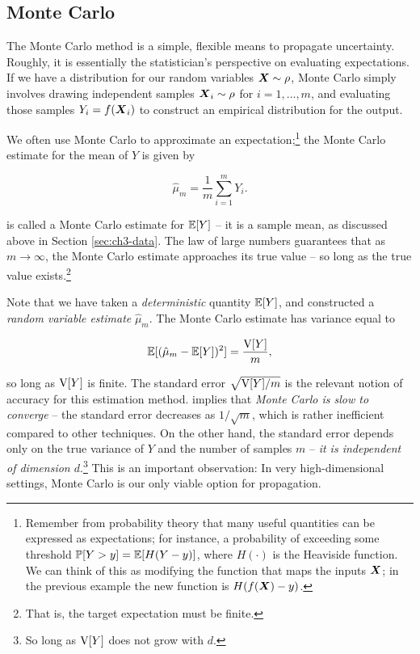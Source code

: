 \documentclass[../primer.tex]{subfiles}
\begin{document}
\subsection{Monte Carlo}
The Monte Carlo method is a simple, flexible means to propagate uncertainty.
Roughly, it is essentially the statistician's perspective on evaluating
expectations. If we have a distribution for our random variables $\boldsymbol{X}\sim\rho$,
Monte Carlo simply involves drawing independent samples $\boldsymbol{X}_i\sim\rho$ for
$i=1,\dots,m$, and evaluating those samples $Y_i = f(\boldsymbol{X}_i)$ to construct an
empirical distribution for the output.

We often use Monte Carlo to approximate an expectation;\footnote{Remember from
  probability theory that many useful quantities can be expressed as
  expectations; for instance, a probability of exceeding some threshold $\mathbb{P}[Y>y]
  = \mathbb{E}[H(Y-y)]$, where $H(\cdot)$ is the Heaviside function. We can think of
  this as modifying the function that maps the inputs $\boldsymbol{X}$; in the previous
  example the new function is $H(f(\boldsymbol{X})-y)$.} the Monte Carlo estimate for the
mean of $Y$ is given by

\begin{equation} \label{eq:ch4-mc-mean}
  \hat{\mu}_m = \frac{1}{m}\sum_{i=1}^m Y_i.
\end{equation}

\noindent {} is called a Monte Carlo estimate for $\mathbb{E}[Y]$ --
it is a sample mean, as discussed above in Section \ref{sec:ch3-data}. The law
of large numbers guarantees that as $m\to\infty$, the Monte Carlo estimate
approaches its true value -- so long as the true value
exists.\cite{owen2013montecarlo}\footnote{That is, the target expectation must
  be finite.}

Note that we have taken a \emph{deterministic} quantity $\mathbb{E}[Y]$, and constructed
a \emph{random variable estimate} $\hat{\mu}_m$. The Monte Carlo estimate has
variance equal to

\begin{equation} \label{eq:ch4-mc-var}
  \mathbb{E}[(\hat{\mu}_m - \mathbb{E}[Y])^2] = \frac{\mathrm{V}[Y]}{m},
\end{equation}

\noindent so long as $\mathrm{V}[Y]$ is finite. The standard error $\sqrt{\mathrm{V}[Y]/m}$ is
the relevant notion of accuracy for this estimation method. 
implies that \emph{Monte Carlo is slow to converge} -- the standard error
decreases as $1/\sqrt{m}$, which is rather inefficient compared to other
techniques. On the other hand, the standard error depends only on the true
variance of $Y$ and the number of samples $m$ -- \emph{it is independent of
  dimension $d$}.\footnote{So long as $\mathrm{V}[Y]$ does not grow with $d$.} This is
an important observation: In very high-dimensional settings, Monte Carlo is our
only viable option for propagation.
\end{document}

